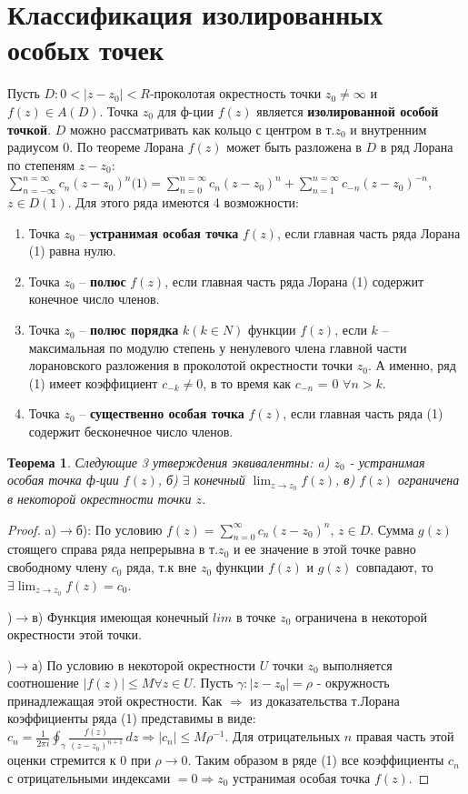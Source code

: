\documentclass{article}
\newtheorem{theorem}{Теорема}[]
\begin{document}
\section{Классификация изолированных особых точек}
Пусть $D:0<|z-z_0|<R$-проколотая окрестность точки $z_0\neq\infty$ и $f(z) \in A(D)$. Точка $z_0$ для ф-ции $f(z)$ является \textbf{изолированной особой точкой}. $D$ можно рассматривать как кольцо с центром в т.$z_0$ и внутренним радиусом 0. По теореме Лорана $f(z)$ может быть разложена в $D$ в ряд Лорана по степеням $z-z_0$: $\sum_{n=-\infty}^{n=\infty}c_n(z-z_0)^n\text{(1)}=\sum_{n=0}^{n=\infty}c_n(z-z_0)^n +\sum_{n=1}^{n=\infty}c_{-n}(z-z_0)^{-n}$, $z \in D(1)$.
Для этого ряда имеются 4 возможности:
\begin{enumerate}
    \item Точка $z_0$ – \textbf{устранимая особая точка} $f(z)$, если главная часть ряда Лорана (1) равна нулю.
    \item Точка $z_0$ – \textbf{полюс} $f(z)$, если главная часть ряда Лорана (1) содержит конечное число членов.    
    \item Точка $z_0$ – \textbf{полюс порядка} $k (k \in N)$ функции $f(z)$, если $k$
– максимальная по модулю степень у ненулевого члена главной части лорановского разложения в проколотой окрестности точки $z_0$. А именно, ряд (1) имеет коэффициент $c_{-k}\neq 0$,
в то время как $c_{-n}$ = 0 $\forall n > k$.
    \item Точка $z_0$ – \textbf{существенно особая точка} $f(z)$, если
главная часть ряда (1) содержит бесконечное число членов.
\end{enumerate}
\begin{theorem}
   Следующие 3 утверждения эквивалентны: a) $z_0$ - устранимая особая точка ф-ции $f(z)$, б) $\exists$ конечный $\displaystyle\lim_{z\rightarrow z_0}f(z)$, в) $f(z)$ ограничена в некоторой окрестности точки $z$.
\end{theorem}
\begin{proof}
    a)$\rightarrow$б): По условию $f(z)=\sum_{n=0}^{\infty}c_n(z-z_0)^n$, $z \in D$. Сумма $g(z)$ стоящего справа ряда непрерывна в т.$z_0$ и ее значение в этой точке равно свободному члену $c_0$ ряда, т.к вне $z_0$ функции $f(z)$ и $g(z)$ совпадают, то $\exists \displaystyle\lim_{z\rightarrow z_0}f(z)=c_0$.
    
    )$\rightarrow$в) Функция имеющая конечный $lim$ в точке $z_0$ ограничена в некоторой окрестности этой точки.

    )$\rightarrow$а) По условию в некоторой окрестности $U$ точки $z_0$ выполняется соотношение $|f(z)|\leq M \forall z \in U$. Пусть $\gamma:|z-z_0|=\rho$ - окружность принадлежащая этой окрестности. Как $\Rightarrow$ из доказательства т.Лорана коэффициенты ряда (1) представимы в виде: $c_n = \frac{1}{2\pi i} \oint_{\gamma} \frac{f(z)}{(z-z_0)^{n+1}} \,dz \Rightarrow |c_n|\leq M\rho^{-1}$. Для отрицательных $n$ правая часть этой оценки стремится к 0 при $\rho \rightarrow 0$. Таким образом в ряде (1) все коэффициенты $c_n$ с отрицательными индексами $=0\Rightarrow z_0$ устранимая особая точка $f(z)$. 
\end{proof}
\end{document}
